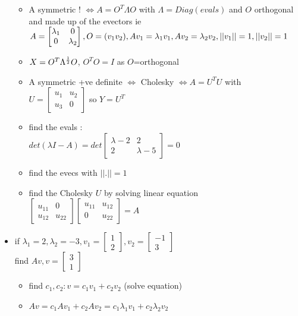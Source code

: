 \documentclass[10pt,landscape,a4paper]{article}
\begin{document}
\begin{multicols*}{4}
\begin{spacing}{0.1}
\begin{itemize}
\begin{itemize}
\item A symmetric ! $\Leftrightarrow A = O^T \Lambda O$ with $\Lambda=Diag(evals)$ and $O$ orthogonal and made up of the evectors ie \\ $A=\begin{bmatrix} \lambda_1 & 0 \\ 0 & \lambda_2 \end{bmatrix}, O=(v_1 v_2), \\ Av_1=\lambda_1 v_1, Av_2=\lambda_2 v_2, ||v_1||=1, ||v_2||=1$
\item $X=O^T \Lambda^{1 \over 2} O$, $O^TO=I$ as $O$=orthogonal

\item A symmetric +ve definite  $\Leftrightarrow$ Cholesky $\Leftrightarrow A=U^TU$ with $U=\begin{bmatrix} u_1 & u_2 \\ u_3 & 0 \end{bmatrix}$ so $Y=U^T$

\item find the evals : \\ $det(\lambda I-A)= det \begin{bmatrix} \lambda-2 & 2 \\ 2 & \lambda-5 \end{bmatrix} = 0$
\item find the evecs with $||.||=1$
\item find the Cholesky $U$ by solving linear equation $\begin{bmatrix} u_{11} & 0 \\ u_{12} & u_{22} \end{bmatrix} \begin{bmatrix} u_{11} & u_{12} \\ 0 & u_{22} \end{bmatrix}  = A $
\end{itemize}

\item \colorbox{green!10}{ if $\lambda_1=2,\lambda_2=-3,v_1= \begin{bmatrix} 1 \\2 \end{bmatrix},v_2= \begin{bmatrix} -1 \\ 3 \end{bmatrix}$ } \\ \colorbox{green!10}{ find $Av,v= \begin{bmatrix} 3 \\1 \end{bmatrix}$ }
\begin{itemize}
	\item find $c_1,c_2 : v = c_1v_1 + c_2v_2$ (solve equation)
	\item $Av=c_1Av_1 + c_2Av_2=c_1\lambda_1v_1 + c_2\lambda_2v_2$
\end{itemize}


\end{itemize}
\end{spacing}
\end{multicols*}
\end{document}

